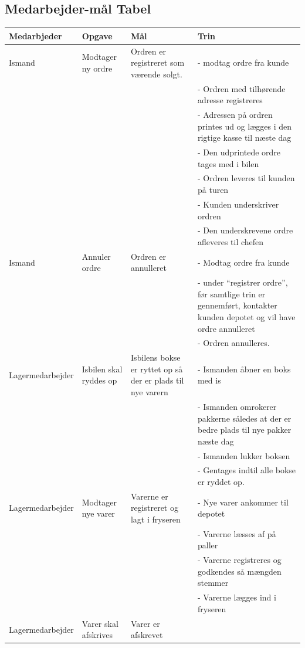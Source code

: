 \subsection{Medarbejder-mål Tabel}
\begin{center}
\begin{longtable}{ |p{90pt}|p{90pt}|p{90pt}|p{90pt}| }
    \hline
    Medarbjeder & Opgave & Mål & Trin \\
    \hline\hline
    Ismand
    & Modtager ny ordre & Ordren er registreret som værende solgt. &
    - modtag ordre fra kunde \\
    &&&
    - Ordren med tilhørende adresse  registreres \\
    &&&
    - Adressen på ordren printes ud og lægges i den rigtige kasse til næste dag \\
    &&&
    - Den udprintede ordre tages med i bilen \\
    &&&
    - Ordren leveres til kunden på turen \\
    &&&
    - Kunden underskriver ordren \\
    &&&
    - Den underskrevene ordre afleveres til chefen \\
    \hline
    Ismand & Annuler ordre & Ordren er annulleret &
    - Modtag ordre fra kunde \\
    &&&
    - under “registrer ordre”, før samtlige trin er gennemført, kontakter kunden depotet og vil have ordre annulleret \\
    &&&
    - Ordren annulleres. \\
    \hline
    Lagermedarbejder
    & Isbilen skal ryddes op & Isbilens bokse er ryttet op så der er plads til nye varern &
    - Ismanden åbner en boks med is \\
    &&&
    - Ismanden omrokerer pakkerne således at der er bedre plads til nye pakker næste dag \\
    &&&
    - Ismanden lukker boksen \\
    &&&
    - Gentages indtil alle bokse er ryddet op. \\
    \hline
    Lagermedarbejder
    & Modtager nye varer & Varerne er registreret og lagt i fryseren &
    - Nye varer ankommer til depotet \\
    &&&
    - Varerne læsses af på paller \\
    &&&
    - Varerne registreres og godkendes så mængden stemmer \\
    &&&
    - Varerne lægges ind i fryseren \\
    \hline
    Lagermedarbejder & Varer skal afskrives & Varer er afskrevet &

\end{longtable}
\end{center}
